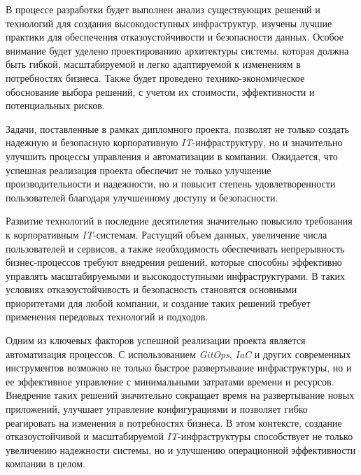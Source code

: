 В процессе разработки будет выполнен анализ существующих решений и технологий для создания высокодоступных инфраструктур, изучены лучшие практики для обеспечения отказоустойчивости и безопасности данных. Особое внимание будет уделено проектированию архитектуры системы, которая должна быть гибкой, масштабируемой и легко адаптируемой к изменениям в потребностях бизнеса. Также будет проведено технико-экономическое обоснование выбора решений, с учетом их стоимости, эффективности и потенциальных рисков.

Задачи, поставленные в рамках дипломного проекта, позволят не только создать надежную и безопасную корпоративную \textit{IT}-инфраструктуру, но и значительно улучшить процессы управления и автоматизации в компании. Ожидается, что успешная реализация проекта обеспечит не только улучшение производительности и надежности, но и повысит степень удовлетворенности пользователей благодаря улучшенному доступу и безопасности.

Развитие технологий в последние десятилетия значительно повысило требования к корпоративным \textit{IT}-системам. Растущий объем данных, увеличение числа пользователей и сервисов, а также необходимость обеспечивать непрерывность бизнес-процессов требуют внедрения решений, которые способны эффективно управлять масштабируемыми и высокодоступными инфраструктурами. В таких условиях отказоустойчивость и безопасность становятся основными приоритетами для любой компании, и создание таких решений требует применения передовых технологий и подходов.

Одним из ключевых факторов успешной реализации проекта является автоматизация процессов. С использованием \textit{GitOps}, \textit{IaC} и других современных инструментов возможно не только быстрое развертывание инфраструктуры, но и ее эффективное управление с минимальными затратами времени и ресурсов. Внедрение таких решений значительно сокращает время на развертывание новых приложений, улучшает управление конфигурациями и позволяет гибко реагировать на изменения в потребностях бизнеса. В этом контексте, создание отказоустойчивой и масштабируемой \textit{IT}-инфраструктуры способствует не только увеличению надежности системы, но и улучшению операционной эффективности компании в целом.